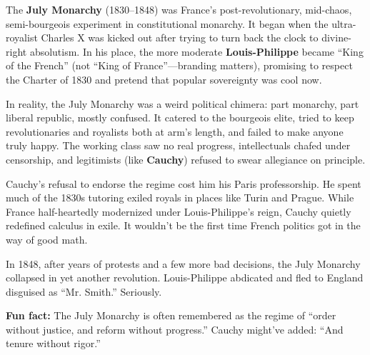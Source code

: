 \begin{tcolorbox}[colback=blue!5!white, colframe=blue!50!black, 
  title={Historical Sidebar: The July Monarchy—When France Hit “Reboot” on Royalty}]
  
      The \textbf{July Monarchy} (1830–1848) was France’s post-revolutionary, mid-chaos, semi-bourgeois experiment in constitutional monarchy. It began when the ultra-royalist Charles X was kicked out after trying to turn back the clock to divine-right absolutism. In his place, the more moderate \textbf{Louis-Philippe} became “King of the French” (not “King of France”—branding matters), promising to respect the Charter of 1830 and pretend that popular sovereignty was cool now.
  
      \medskip
  
      In reality, the July Monarchy was a weird political chimera: part monarchy, part liberal republic, mostly confused. It catered to the bourgeois elite, tried to keep revolutionaries and royalists both at arm’s length, and failed to make anyone truly happy. The working class saw no real progress, intellectuals chafed under censorship, and legitimists (like \textbf{Cauchy}) refused to swear allegiance on principle.
  
      \medskip
  
      Cauchy’s refusal to endorse the regime cost him his Paris professorship. He spent much of the 1830s tutoring exiled royals in places like Turin and Prague. While France half-heartedly modernized under Louis-Philippe’s reign, Cauchy quietly redefined calculus in exile. It wouldn’t be the first time French politics got in the way of good math.
  
      \medskip
  
      In 1848, after years of protests and a few more bad decisions, the July Monarchy collapsed in yet another revolution. Louis-Philippe abdicated and fled to England disguised as “Mr. Smith.” Seriously.
  
      \medskip
  
      \textbf{Fun fact:} The July Monarchy is often remembered as the regime of “order without justice, and reform without progress.” Cauchy might’ve added: “And tenure without rigor.”
  
\end{tcolorbox}

